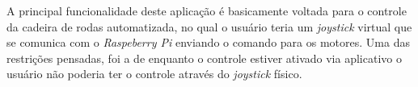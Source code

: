 A principal funcionalidade deste aplicação é basicamente voltada para o controle da cadeira de rodas automatizada, no qual o usuário teria um \textit{joystick} virtual que se comunica com o \textit{Raspeberry Pi} enviando o comando para os motores.
Uma das restrições pensadas, foi a de enquanto o controle estiver ativado via aplicativo o usuário não poderia ter o controle através do \textit{joystick} físico.

